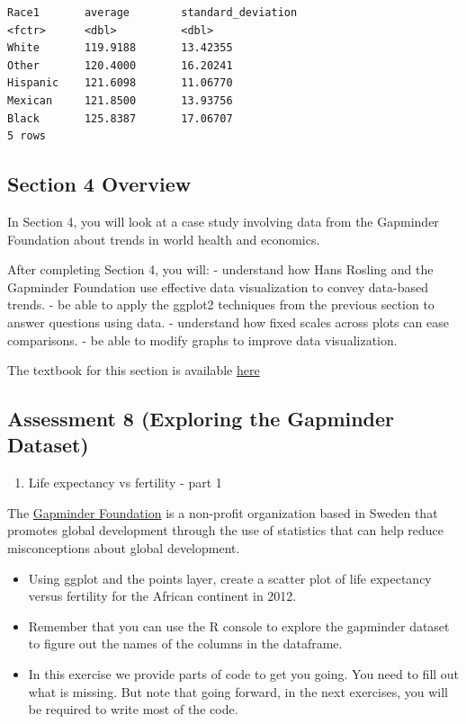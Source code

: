 \documentclass[
]{article}
\providecommand{\tightlist}{%
  \setlength{\itemsep}{0pt}\setlength{\parskip}{0pt}}
\begin{document}
\begin{verbatim}
Race1       average        standard_deviation
<fctr>      <dbl>          <dbl>
White       119.9188       13.42355
Other       120.4000       16.20241
Hispanic    121.6098       11.06770
Mexican     121.8500       13.93756
Black       125.8387       17.06707
5 rows
\end{verbatim}

\hypertarget{section-4-overview}{%
\subsection{Section 4 Overview}\label{section-4-overview}}

In Section 4, you will look at a case study involving data from the
Gapminder Foundation about trends in world health and economics.

After completing Section 4, you will: - understand how Hans Rosling and
the Gapminder Foundation use effective data visualization to convey
data-based trends. - be able to apply the ggplot2 techniques from the
previous section to answer questions using data. - understand how fixed
scales across plots can ease comparisons. - be able to modify graphs to
improve data visualization.

The textbook for this section is available
\href{https://rafalab.github.io/dsbook/gapminder.html\#case-study-new-insights-on-poverty}{here}

\hypertarget{assessment-8-exploring-the-gapminder-dataset}{%
\subsection{Assessment 8 (Exploring the Gapminder
Dataset)}\label{assessment-8-exploring-the-gapminder-dataset}}

\begin{enumerate}
\def\labelenumi{\arabic{enumi}.}
\tightlist
\item
  Life expectancy vs fertility - part 1
\end{enumerate}

The \href{https://www.gapminder.org/}{Gapminder Foundation} is a
non-profit organization based in Sweden that promotes global development
through the use of statistics that can help reduce misconceptions about
global development.

\begin{itemize}
\tightlist
\item
  Using ggplot and the points layer, create a scatter plot of life
  expectancy versus fertility for the African continent in 2012.
\item
  Remember that you can use the R console to explore the gapminder
  dataset to figure out the names of the columns in the dataframe.
\item
  In this exercise we provide parts of code to get you going. You need
  to fill out what is missing. But note that going forward, in the next
  exercises, you will be required to write most of the code.
\end{itemize}
\end{document}
